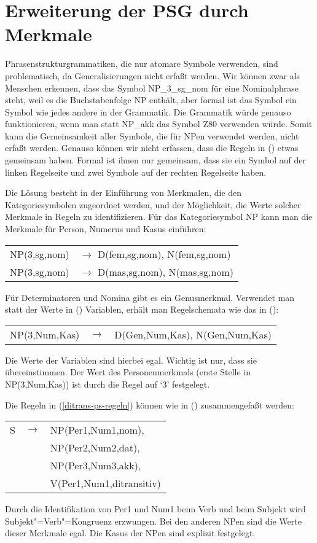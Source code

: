 \section{Erweiterung der PSG durch Merkmale}


Phrasenstrukturgrammatiken, die nur atomare Symbole verwenden, sind problematisch,
da Generalisierungen nicht erfaßt werden. Wir können zwar als Menschen erkennen, dass
das Symbol NP\_3\_sg\_nom für eine Nominalphrase steht, weil es die Buchstabenfolge NP
enthält, aber formal ist das Symbol ein Symbol wie jedes andere in der Grammatik. Die Grammatik
würde genauso funktionieren, wenn man statt NP\_akk das Symbol Z80 verwenden würde. Somit kann die
Gemeinsamkeit aller Symbole, die für NPen verwendet werden, nicht erfaßt werden. 
Genauso können wir nicht erfassen, dass die Regeln in () etwas gemeinsam haben.
Formal ist ihnen nur gemeinsam, dass sie ein Symbol auf der linken Regelseite und 
zwei Symbole auf der rechten Regelseite haben.

Die Lösung besteht in der Einführung von Merkmalen, die den Kategoriesymbolen
zugeordnet werden, und der Möglichkeit, die Werte solcher Merkmale in Regeln zu identifizieren.
Für das Kategoriesymbol NP kann man \zb die Merkmale für Person, Numerus und Kasus einführen:
\ea
\begin{tabular}[t]{@{}l@{ }l}
NP(3,sg,nom)  & $\to$ D(fem,sg,nom), N(fem,sg,nom)\\
NP(3,sg,nom)  & $\to$ D(mas,sg,nom), N(mas,sg,nom)\\
\end{tabular}
\z
Für Determinatoren und Nomina gibt es ein Genusmerkmal. Verwendet man statt der
Werte in () Variablen, erhält man Regelschemata wie das in ():
\ea
\begin{tabular}[t]{@{}l@{ }l@{ }l}
NP({3},{Num},{Kas}) & $\to$ & D(Gen,{Num},{Kas}), N(Gen,{Num},{Kas})\\
\end{tabular}
\z
Die Werte der Variablen sind hierbei egal. Wichtig ist nur, dass sie übereinstimmen.
Der Wert des Personenmerkmals (erste Stelle in NP(3,Num,Kas)) ist durch die Regel auf `3' festgelegt.

Die Regeln in (\ref{ditrans-ps-regeln}) können wie in () zusammengefaßt werden:
\ea
\begin{tabular}[t]{@{}l@{ }l@{ }l}
S  & $\to$ & NP({Per1},{Num1},{nom}), \\
   &       & NP(Per2,Num2,{dat}),\\
   &       & NP(Per3,Num3,{akk}),\\
   &       & V({Per1},{Num1},ditransitiv)\\
\end{tabular}
\z
Durch die Identifikation von Per1 und Num1 beim Verb und beim Subjekt wird Subjekt"=Verb"=Kongruenz erzwungen.
Bei den anderen NPen sind die Werte dieser Merkmale egal. Die Kasus der NPen sind explizit festgelegt.

